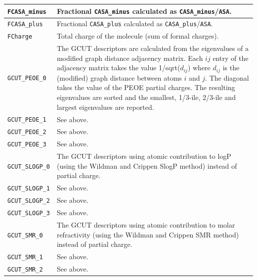 \documentclass[12pt,a4paper]{article}
\begin{document}
\begin{longtable}{@{\zz}|p{}|p{}|}
\texttt{FCASA\_minus} & Fractional \texttt{CASA\_minus} calculated as 
\texttt{CASA\_minus}/\texttt{ASA}.\\ \hline

\texttt{FCASA\_plus} & Fractional \texttt{CASA\_plus} calculated as 
\texttt{CASA\_plus}/\texttt{ASA}.\\ \hline

\texttt{FCharge} & Total charge of the molecule (sum of formal charges).\\ \hline

\texttt{GCUT\_PEOE\_0} & The GCUT descriptors are calculated from the 
eigenvalues of a modified graph distance adjacency matrix. Each $ij$ entry of 
the adjacency matrix takes the value 1/sqrt($d_{ij}$) where $d_{ij}$ is the 
(modified) graph distance between atoms $i$ and $j$. The diagonal takes the 
value of the PEOE partial charges. The resulting eigenvalues are sorted and 
the smallest, 1/3-ile, 2/3-ile and largest eigenvalues are reported.\\ \hline

\texttt{GCUT\_PEOE\_1} & See above.\\ \hline

\texttt{GCUT\_PEOE\_2} & See above.\\ \hline

\texttt{GCUT\_PEOE\_3} & See above.\\ \hline

\texttt{GCUT\_SLOGP\_0} & The GCUT descriptors using atomic contribution to 
logP (using the Wildman and Crippen SlogP method) instead of partial charge.\\ 
\hline

\texttt{GCUT\_SLOGP\_1} & See above.\\ \hline

\texttt{GCUT\_SLOGP\_2} & See above.\\ \hline

\texttt{GCUT\_SLOGP\_3} & See above.\\ \hline

\texttt{GCUT\_SMR\_0} & The GCUT descriptors using atomic contribution to 
molar refractivity (using the Wildman and Crippen SMR method) instead of 
partial charge.\\ \hline

\texttt{GCUT\_SMR\_1} & See above.\\ \hline

\texttt{GCUT\_SMR\_2} & See above.\\ \hline


\end{longtable}
\end{document}
